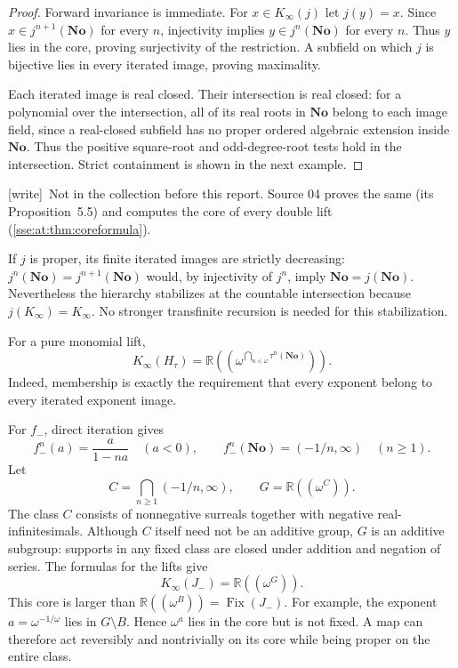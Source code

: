 \documentclass[11pt,a4paper]{article}
\numberwithin{equation}{section}
\theoremstyle{plain}
\newtheorem{proposition}[theorem]{Proposition}
\theoremstyle{definition}
\theoremstyle{remark}
\newcommand{\No}{\mathbf{No}}
\newcommand{\R}{\mathbb{R}}
\newcommand{\Fix}{\operatorname{Fix}}
\newcommand{\NF}[1]{\R((\omega^{#1}))}
\newcommand{\wtag}{\textup{\textsf{[write]}}}%
\newenvironment{wnote}{\par\smallskip\noindent\wtag\ }{\par\smallskip}
\begin{document}
\begin{proof}
Forward invariance is immediate. For $x\in K_\infty(j)$ let $j(y)=x$.
Since $x\in j^{n+1}(\No)$ for every $n$, injectivity implies
$y\in j^n(\No)$ for every $n$. Thus $y$ lies in the core, proving
surjectivity of the restriction. A subfield on which $j$ is bijective
lies in every iterated image, proving maximality.

Each iterated image is real closed. Their intersection is real closed:
for a polynomial over the intersection, all of its real roots in $\No$
belong to each image field, since a real-closed subfield has no proper
ordered algebraic extension inside $\No$. Thus the positive square-root
and odd-degree-root tests hold in the intersection. Strict containment is
shown in the next example.
\end{proof}
\begin{wnote}Not in the collection before this report. Source 04 proves the same (its Proposition~5.5) and computes the core of every double lift (\cref{sse:at:thm:coreformula}).\end{wnote}
If $j$ is proper, its finite iterated images are strictly decreasing:
$j^n(\No)=j^{n+1}(\No)$ would, by injectivity of $j^n$, imply
$\No=j(\No)$. Nevertheless the hierarchy stabilizes at the countable
intersection because $j(K_\infty)=K_\infty$. No stronger transfinite
recursion is needed for this stabilization.

For a pure monomial lift,
\begin{equation}\label{sse:eq:hcore}
 K_\infty(H_\tau)=\NF{\bigcap_{n<\omega}\tau^n(\No)}.
\end{equation}
Indeed, membership is exactly the requirement that every exponent belong
to every iterated exponent image.

For $f_-$, direct iteration gives
\[
 f_-^n(a)=\frac{a}{1-na}\quad(a<0),\qquad
 f_-^n(\No)=(-1/n,\infty)\quad(n\ge1).
\]
Let
\[
 C=\bigcap_{n\ge1}(-1/n,\infty),\qquad G=\NF{C}.
\]
The class $C$ consists of nonnegative surreals together with negative
real-infinitesimals. Although $C$ itself need not be an additive group,
$G$ is an additive subgroup: supports in any fixed class are closed under
addition and negation of series. The formulas for the lifts give
\begin{equation}\label{sse:eq:Jcore}
 K_\infty(J_-)=\NF{G}.
\end{equation}
This core is larger than $\NF{B}=\Fix(J_-)$. For example, the exponent
$a=\omega^{-1/\omega}$ lies in $G\setminus B$. Hence $\omega^a$ lies in
the core but is not fixed. A map can therefore act reversibly and
nontrivially on its core while being proper on the entire class.
\end{document}
